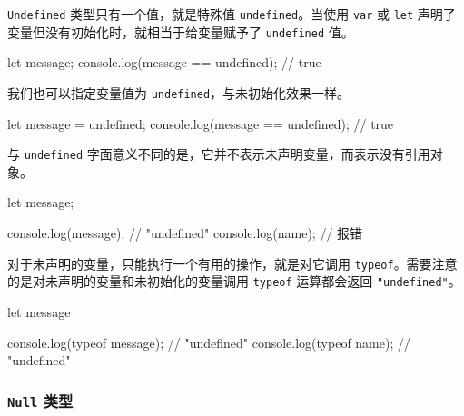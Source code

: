 \texttt{Undefined} 类型只有一个值，就是特殊值 \texttt{undefined}。当使用 \texttt{var} 或 \texttt{let} 声明了变量但没有初始化时，就相当于给变量赋予了 \texttt{undefined} 值。

\begin{JavaScript}
let message;
console.log(message == undefined);  // true
\end{JavaScript}

我们也可以指定变量值为 \texttt{undefined}，与未初始化效果一样。

\begin{JavaScript}
let message = undefined;
console.log(message == undefined);  // true
\end{JavaScript}


与 \texttt{undefined} 字面意义不同的是，它并不表示未声明变量，而表示没有引用对象。

\begin{JavaScript}
let message;

console.log(message);   // "undefined"
console.log(name);      // 报错
\end{JavaScript}

对于未声明的变量，只能执行一个有用的操作，就是对它调用 \texttt{typeof}。需要注意的是对未声明的变量和未初始化的变量调用 \texttt{typeof} 运算都会返回 \texttt{"undefined"}。

\begin{JavaScript}
let message 

console.log(typeof message);   // "undefined"
console.log(typeof name);      // "undefined"
\end{JavaScript}


\subsubsection{\texttt{Null} 类型}

